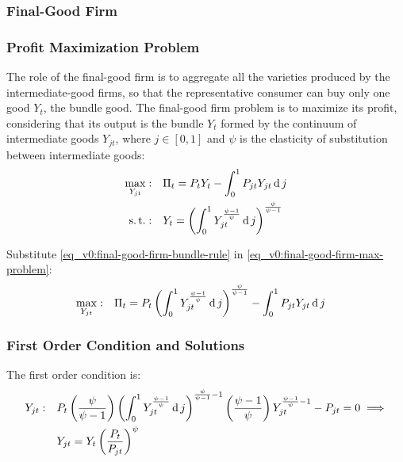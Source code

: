 \documentclass[../thesis.tex]{subfiles}
\begin{document}
	
	\subsubsection{Final-Good Firm}
	
	\subsubsection*{Profit Maximization Problem}
	
	The role of the final-good firm is to aggregate all the varieties produced by the intermediate-good firms, so that the representative consumer can buy only one good $Y_t$, the bundle good. The final-good firm problem is to maximize its profit, considering that its output is the bundle $Y_t$ formed by the continuum of intermediate goods $Y_{jt}$, where $j \in [0,1]$ and $\psi$ is the elasticity of substitution between intermediate goods:
	\begin{align}
		\label{eq_v0:final-good-firm-max-problem}
		\max_{Y_{jt}}: &\quad \Pi_t = P_t Y_t - \int_{0}^{1} P_{jt} Y_{jt} \operatorname{d} j\\
		\label{eq_v0:final-good-firm-bundle-rule}
		\operatorname{s.t.}: & \quad Y_t = \left( \int_{0}^{1} Y_{jt}^{\frac{\psi-1}{\psi}} \operatorname{d} j \right)^{\frac{\psi}{\psi-1}}
	\end{align}
	
	Substitute \ref{eq_v0:final-good-firm-bundle-rule} in \ref{eq_v0:final-good-firm-max-problem}:
	\begin{align}
		\label{eq_v0:final-good-firm-max-problem-2}
		\max_{Y_{jt}}: & \quad \Pi_t = P_t \left( \int_{0}^{1} Y_{jt}^{\frac{\psi-1}{\psi}} \operatorname{d} j \right)^{\frac{\psi}{\psi-1}} - \int_{0}^{1} P_{jt} Y_{jt} \operatorname{d} j
	\end{align}
	
	\subsubsection*{First Order Condition and Solutions}
	
	The first order condition is:
	\begin{align}
		Y_{jt}:\quad & P_t \left( \frac{\psi}{\psi-1} \right) \left( \int_{0}^{1} Y_{jt}^{\frac{\psi-1}{\psi}} \operatorname{d} j \right)^{\frac{\psi}{\psi-1}-1} \left( \frac{\psi-1}{\psi} \right) Y_{jt}^{\frac{\psi-1}{\psi}-1} - P_{jt} = 0 \implies \nonumber \\
		\label{eq_v0:final-good-firm-FOC}
		& Y_{jt} = Y_t \left( \frac{P_t}{P_{jt}} \right)^{\psi}
	\end{align}
	
\end{document}
